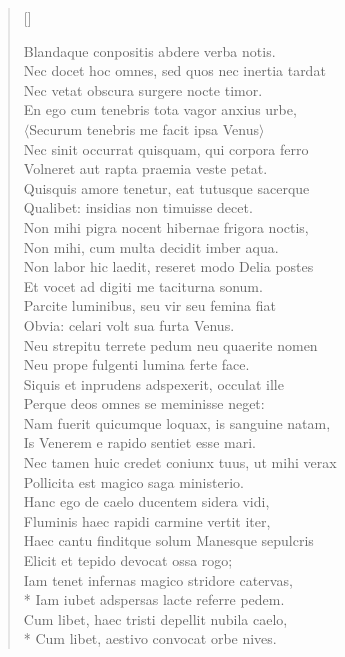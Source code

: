 \begin{verse}[\versewidth]
\begin{altverse}
{Blandaque conpositis abdere verba notis.\\
Nec docet hoc omnes, sed quos nec inertia tardat\\
Nec vetat obscura surgere nocte timor.\\
En ego cum tenebris tota vagor anxius urbe,\\
$\langle$Securum tenebris me facit ipsa Venus$\rangle$\\
Nec sinit occurrat quisquam, qui corpora ferro\\
Volneret aut rapta praemia veste petat.\\
Quisquis amore tenetur, eat tutusque sacerque\\
Qualibet: insidias non timuisse decet.\\
Non mihi pigra nocent hibernae frigora noctis,\\
Non mihi, cum multa decidit imber aqua.\\
Non labor hic laedit, reseret modo Delia postes\\
Et vocet ad digiti me taciturna sonum.\\
Parcite luminibus, seu vir seu femina fiat\\
Obvia: celari volt sua furta Venus.\\
Neu strepitu terrete pedum neu quaerite nomen\\
Neu prope fulgenti lumina ferte face.\\
Siquis et inprudens adspexerit, occulat ille\\
Perque deos omnes se meminisse neget:\\
Nam fuerit quicumque loquax, is sanguine natam,\\
Is Venerem e rapido sentiet esse mari.\\
Nec tamen huic credet coniunx tuus, ut mihi verax\\
Pollicita est magico saga ministerio.\\
Hanc ego de caelo ducentem sidera vidi,\\
Fluminis haec rapidi carmine vertit iter,\\
Haec cantu finditque solum Manesque sepulcris\\
Elicit et tepido devocat ossa rogo;\\
Iam tenet infernas magico stridore catervas,\\*
Iam iubet adspersas lacte referre pedem.\\
Cum libet, haec tristi depellit nubila caelo,\\*
Cum libet, aestivo convocat orbe nives.\\
}
\end{altverse}
\end{verse}
